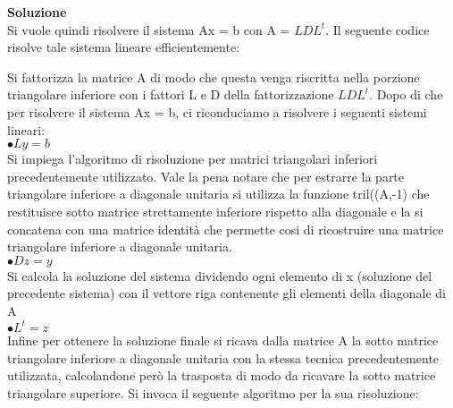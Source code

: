 \large\noindent{}
\begin{flushleft}
	\large \textbf{Soluzione}\\[0.5cm]
	Si vuole quindi risolvere il sistema Ax = b con A = $LDL^{t}$. Il seguente codice risolve tale sistema lineare efficientemente:
	
	Si fattorizza la matrice A di modo che questa venga riscritta nella porzione triangolare inferiore con i fattori L e D della fattorizzazione $LDL^{t}$. Dopo di che per risolvere il sistema Ax = b, ci riconduciamo a risolvere i seguenti sistemi lineari:\\[0.3cm]
	$\bullet Ly = b$\\[0.1cm]
	Si impiega l'algoritmo di risoluzione per matrici triangolari inferiori precedentemente utilizzato. Vale la pena notare che per estrarre la parte triangolare inferiore a diagonale unitaria si utilizza la funzione tril((A,-1) che restituisce sotto matrice strettamente inferiore rispetto alla diagonale e la si concatena con una matrice identità che permette cosi di ricostruire una matrice triangolare inferiore a diagonale unitaria.\\[0.3cm]
	$\bullet Dz = y$\\[0.1cm]
	Si calcola la soluzione del sistema dividendo ogni elemento di x (soluzione del precedente sistema) con il vettore riga contenente gli elementi della diagonale di A\\[0.3cm]
	$\bullet L^{t} = z$\\[0.1cm]
	Infine per ottenere la soluzione finale si ricava dalla matrice A la sotto matrice triangolare inferiore a diagonale unitaria con la stessa tecnica precedentemente utilizzata, calcolandone però la trasposta di modo da ricavare la sotto matrice triangolare superiore. Si invoca il seguente algoritmo per la sua risoluzione:
	
	\end{flushleft}
